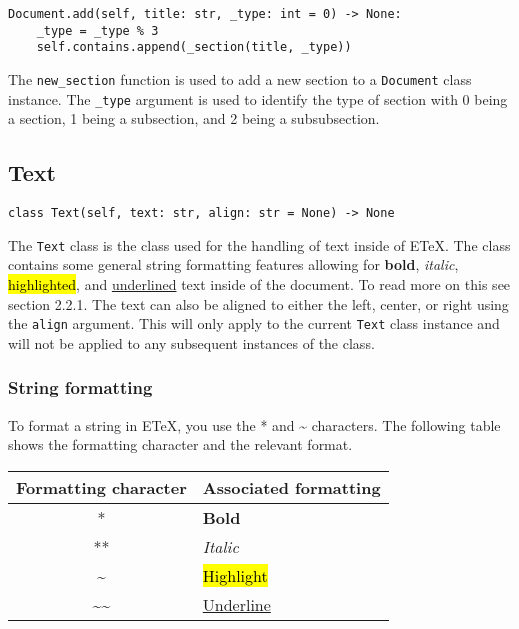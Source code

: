 \documentclass{article}
\begin{document}
\lstset{language=Python}
\begin{lstlisting}
Document.add(self, title: str, _type: int = 0) -> None:
	_type = _type % 3
	self.contains.append(_section(title, _type))
\end{lstlisting}
The \verb|new_section| function is used to add a new section to a \verb|Document| class instance. The \verb|_type| argument is used to identify the type of section with 0 being a section, 1 being a subsection, and 2 being a subsubsection.\subsection[Text]{Text}
\lstset{language=Python}
\begin{lstlisting}
class Text(self, text: str, align: str = None) -> None
\end{lstlisting}
The \verb|Text| class is the class used for the handling of text inside of ETeX. The class contains some general string formatting features allowing for \textbf{bold}, \textit{italic}, \hl{highlighted}, and \underline{underlined} text inside of the document. To read more on this see section 2.2.1. The text can also be aligned to either the left, center, or right using the \verb|align| argument. This will only apply to the current \verb|Text| class instance and will not be applied to any subsequent instances of the class.\subsubsection[String formatting]{String formatting}
To format a string in ETeX, you use the * and \~{} characters. The following table shows the formatting character and the relevant format.\\
\begin{center}
\begin{tabular}{| c | l |}
\hline
Formatting character & Associated formatting \\ \hline
* & \textbf{Bold} \\
** & \textit{Italic} \\
\~{} & \hl{Highlight} \\
\~{}\~{} & \underline{Underline} \\
\hline
\end{tabular}
\end{center}
\end{document}

